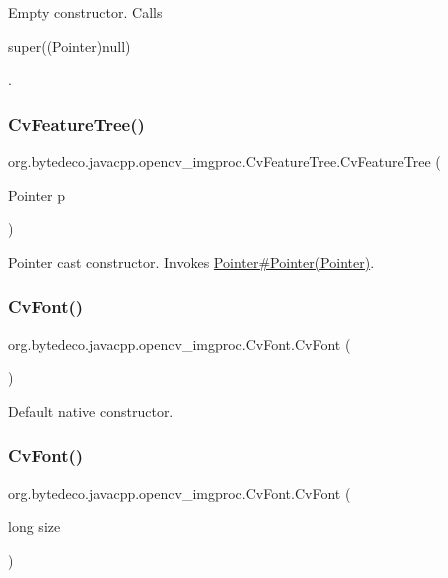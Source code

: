 Empty constructor. Calls
\begin{DoxyCode}
super((Pointer)null) 
\end{DoxyCode}
 . \mbox{\label{group__imgproc_gab59ec65713a2411ca46f665e7ed0ed65}} 
\subsubsection{\texorpdfstring{Cv\+Feature\+Tree()}{CvFeatureTree()}\hspace{0.1cm}{\footnotesize\ttfamily [2/2]}}
{\footnotesize\ttfamily org.\+bytedeco.\+javacpp.\+opencv\+\_\+imgproc.\+Cv\+Feature\+Tree.\+Cv\+Feature\+Tree (\begin{DoxyParamCaption}\item[{Pointer}]{p }\end{DoxyParamCaption})\hspace{0.3cm}{\ttfamily [inline]}}

Pointer cast constructor. Invokes \hyperlink{}{Pointer\#\+Pointer(\+Pointer)}. \mbox{\label{group__imgproc_ga53abe9deb6276658b9dc59eed7558c14}} 
\subsubsection{\texorpdfstring{Cv\+Font()}{CvFont()}\hspace{0.1cm}{\footnotesize\ttfamily [1/3]}}
{\footnotesize\ttfamily org.\+bytedeco.\+javacpp.\+opencv\+\_\+imgproc.\+Cv\+Font.\+Cv\+Font (\begin{DoxyParamCaption}{ }\end{DoxyParamCaption})\hspace{0.3cm}{\ttfamily [inline]}}

Default native constructor. \mbox{\label{group__imgproc_ga975d7e1cd96341017ba94edf5d67c293}} 
\subsubsection{\texorpdfstring{Cv\+Font()}{CvFont()}\hspace{0.1cm}{\footnotesize\ttfamily [2/3]}}
{\footnotesize\ttfamily org.\+bytedeco.\+javacpp.\+opencv\+\_\+imgproc.\+Cv\+Font.\+Cv\+Font (\begin{DoxyParamCaption}\item[{long}]{size }\end{DoxyParamCaption})\hspace{0.3cm}{\ttfamily [inline]}}

